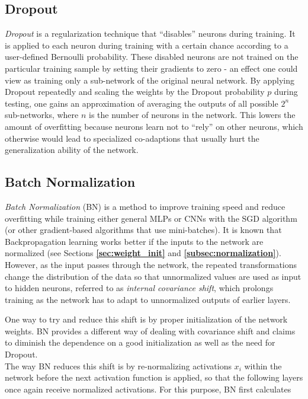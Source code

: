 	\subsection {Dropout}
\label{subsec:dropout}
\textit{Dropout} is a regularization technique \cite{dropout} that ``disables'' neurons during training. It is applied to each neuron during training with a certain chance according to a user-defined Bernoulli probability. These disabled neurons are not trained on the particular training sample by setting their gradients to zero - an effect one could view as training only a sub-network of the original neural network. By applying Dropout repeatedly and scaling the weights by the Dropout probability $p$ during testing, one gains an approximation of averaging the outputs of all possible $2^n$ sub-networks, where $n$ is the number of neurons in the network. This lowers the amount of overfitting because neurons learn not to ``rely'' on other neurons, which otherwise would lead to specialized co-adaptions that usually hurt the generalization ability of the network.



	\subsection {Batch Normalization}
\label{subsec:batchnorm}
\textit{Batch Normalization} (BN) \cite{batchnorm, batchnorm_pres} is a method to improve training speed and reduce overfitting while training either general MLPs or CNNs with the SGD algorithm (or other gradient-based algorithms that use mini-batches). It is known that Backpropagation learning works better if the inputs to the network are normalized (see Sections \textbf{\ref{sec:weight_init}} and \textbf{\ref{subsec:normalization}}). However, as the input passes through the network, the repeated transformations change the distribution of the data so that unnormalized values are used as input to hidden neurons, referred to as \textit{internal covariance shift}, which prolongs training as the network has to adapt to unnormalized outputs of earlier layers.

One way to try and reduce this shift is by proper initialization of the network weights. BN provides a different way of dealing with covariance shift and claims to diminish the dependence on a good initialization as well as the need for Dropout.\\

The way BN reduces this shift is by re-normalizing activations $x_i$ within the network before the next activation function is applied, so that the following layers once again receive normalized activations. For this purpose, BN first calculates

